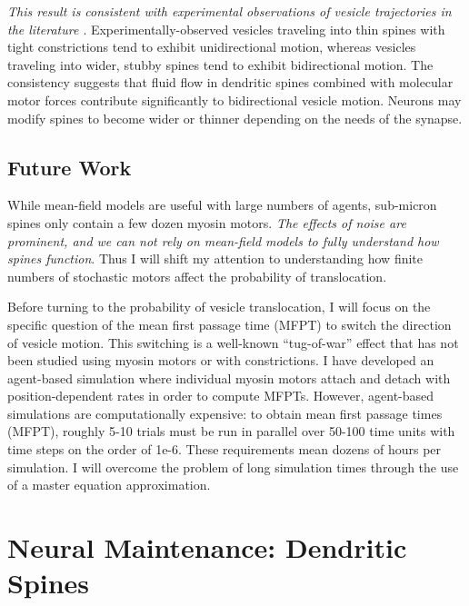 \documentclass[a4paper,11pt]{article}
\begin{document}
\textit{This result is consistent with experimental observations of vesicle trajectories in the literature \cite{park2020dynamics}}. Experimentally-observed vesicles traveling into thin spines with tight constrictions tend to exhibit unidirectional motion, whereas vesicles traveling into wider, stubby spines tend to exhibit bidirectional motion. The consistency suggests that fluid flow in dendritic spines combined with molecular motor forces contribute significantly to bidirectional vesicle motion. Neurons may modify spines to become wider or thinner depending on the needs of the synapse.

\subsection{Future Work}
While mean-field models are useful with large numbers of agents, sub-micron spines only contain a few dozen myosin motors. \textit{The effects of noise are prominent, and we can not rely on mean-field models to fully understand how spines function}. Thus I will shift my attention to understanding how finite numbers of stochastic motors affect the probability of translocation.

Before turning to the probability of vesicle translocation, I will focus on the specific question of the mean first passage time (MFPT) to switch the direction of vesicle motion. This switching is a well-known ``tug-of-war'' effect \cite{julicher1995cooperative} that has not been studied using myosin motors or with constrictions. I have developed an agent-based simulation where individual myosin motors attach and detach with position-dependent rates in order to compute MFPTs. However, agent-based simulations are computationally expensive: to obtain mean first passage times (MFPT), roughly 5-10 trials must be run in parallel over 50-100 time units with time steps on the order of 1e-6. These requirements mean dozens of hours per simulation. I will overcome the problem of long simulation times through the use of a master equation approximation.

\section{Neural Maintenance: Dendritic Spines} \label{sec:maintenance}
\end{document}

